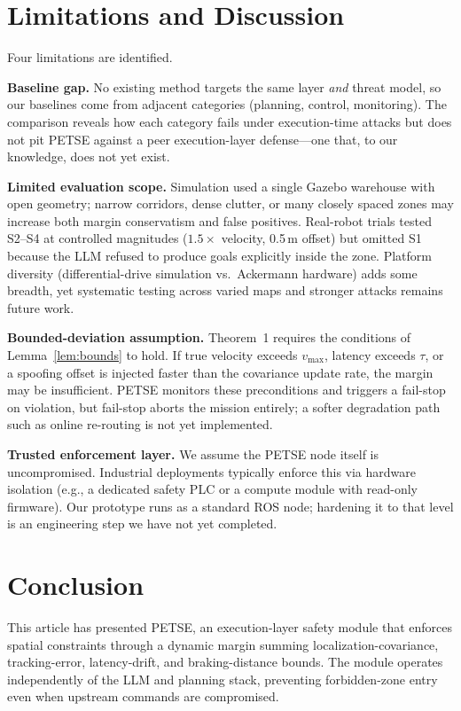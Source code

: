 \documentclass[journal,twoside,web]{ieeecolor}
\begin{document}
\section{Limitations and Discussion}

Four limitations are identified.

\textbf{Baseline gap.} No existing method targets the same layer \emph{and} threat model, so our baselines come from adjacent categories (planning, control, monitoring). The comparison reveals how each category fails under execution-time attacks but does not pit PETSE against a peer execution-layer defense---one that, to our knowledge, does not yet exist.

\textbf{Limited evaluation scope.} Simulation used a single Gazebo warehouse with open geometry; narrow corridors, dense clutter, or many closely spaced zones may increase both margin conservatism and false positives. Real-robot trials tested S2--S4 at controlled magnitudes ($1.5\times$ velocity, 0.5\,m offset) but omitted S1 because the LLM refused to produce goals explicitly inside the zone. Platform diversity (differential-drive simulation vs.\ Ackermann hardware) adds some breadth, yet systematic testing across varied maps and stronger attacks remains future work.

\textbf{Bounded-deviation assumption.} Theorem~1 requires the conditions of Lemma~\ref{lem:bounds} to hold. If true velocity exceeds $v_{\max}$, latency exceeds $\tau$, or a spoofing offset is injected faster than the covariance update rate, the margin may be insufficient. PETSE monitors these preconditions and triggers a fail-stop on violation, but fail-stop aborts the mission entirely; a softer degradation path such as online re-routing is not yet implemented.

\textbf{Trusted enforcement layer.} We assume the PETSE node itself is uncompromised. Industrial deployments typically enforce this via hardware isolation (e.g., a dedicated safety PLC or a compute module with read-only firmware). Our prototype runs as a standard ROS node; hardening it to that level is an engineering step we have not yet completed.

\section{Conclusion}
This article has presented PETSE, an execution-layer safety module that enforces spatial constraints through a dynamic margin summing localization-covariance, tracking-error, latency-drift, and braking-distance bounds. The module operates independently of the LLM and planning stack, preventing forbidden-zone entry even when upstream commands are compromised.
\end{document}
